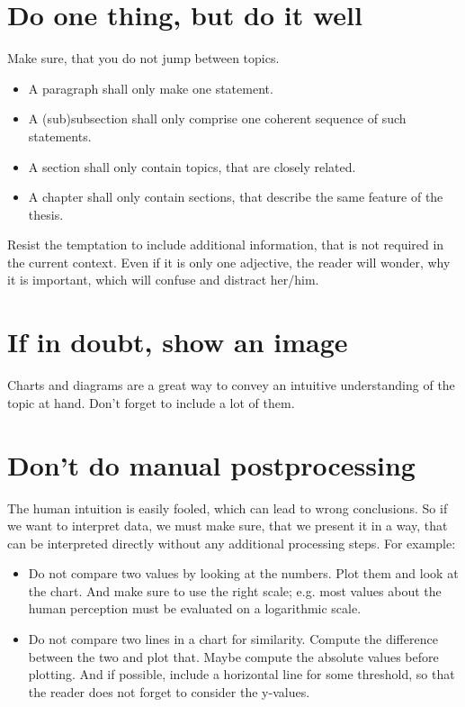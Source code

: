 \section{Do one thing, but do it well}
Make sure, that you do not jump between topics.
\begin{itemize}
	\item A paragraph shall only make one statement.
	\item A (sub)subsection shall only comprise one coherent sequence of such statements.
	\item A section shall only contain topics, that are closely related.
	\item A chapter shall only contain sections, that describe the same feature of the thesis.
\end{itemize}

Resist the temptation to include additional information, that is not required in the current context.
Even if it is only one adjective, the reader will wonder, why it is important, which will confuse and distract her/him.

\section{If in doubt, show an image}
Charts and diagrams are a great way to convey an intuitive understanding of the topic at hand.
Don't forget to include a lot of them.

\section{Don't do manual postprocessing}
The human intuition is easily fooled, which can lead to wrong conclusions.
So if we want to interpret data, we must make sure, that we present it in a way, that can be interpreted directly without any additional processing steps.
For example:

\begin{itemize}
	\item Do not compare two values by looking at the numbers.
	      Plot them and look at the chart.
	      And make sure to use the right scale; e.g. most values about the human perception must be evaluated on a logarithmic scale.
	\item Do not compare two lines in a chart for similarity.
	      Compute the difference between the two and plot that.
		  Maybe compute the absolute values before plotting.
	      And if possible, include a horizontal line for some threshold, so that the reader does not forget to consider the y-values.
\end{itemize}

